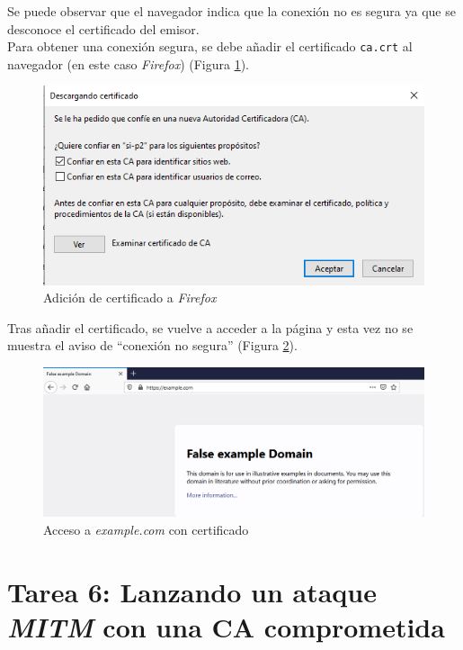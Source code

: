 \documentclass[10pt,a4paper]{article}
\begin{document}
Se puede observar que el navegador indica que la conexión no es segura ya que se desconoce el certificado del emisor.\\

Para obtener una conexión segura, se debe añadir el certificado \texttt{ca.crt} al navegador (en este caso \emph{Firefox}) (Figura \ref{fig:Tarea5_paso4a}).\\

\begin{figure}[h!]
	\centering
	\includegraphics[scale=0.6]{images/Tarea5_paso4a.png}
	\caption{Adición de certificado a \emph{Firefox}}
	\label{fig:Tarea5_paso4a}
\end{figure}

\newpage
Tras añadir el certificado, se vuelve a acceder a la página y esta vez no se muestra el aviso de ``conexión no segura'' (Figura \ref{fig:Tarea5_paso4b}).\\

\begin{figure}[h!]
	\centering
	\includegraphics[scale=0.5]{images/Tarea5_paso4b.png}
	\caption{Acceso a \textit{example.com} con certificado}
	\label{fig:Tarea5_paso4b}
\end{figure}


\section{Tarea 6: Lanzando un ataque \emph{MITM} con una CA comprometida}
\end{document}
